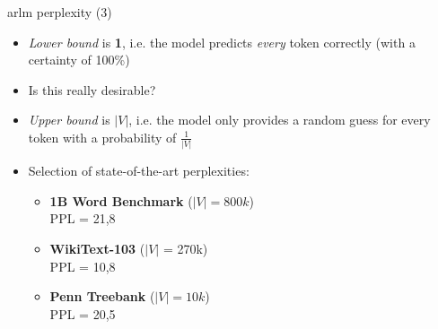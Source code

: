 \documentclass[11pt,compress,t,notes=noshow, xcolor=table]{beamer}
\begin{document}
\begin{frame}{arlm perplexity (3)}

\vfill

\begin{itemize}
	\item \textit{Lower bound} is \textbf{1}, i.e. the model predicts \textit{every} token correctly (with a certainty of 100\%)
	\item \ques Is this really desirable?
	\item \textit{Upper bound} is $|V|$, i.e. the model only provides a random guess for every token with a probability of $\frac{1}{|V|}$
	\item Selection of state-of-the-art perplexities:
			\begin{itemize}
				\item \textbf{1B Word Benchmark}  ($|V| = 800k$)\\
				PPL = 21,8 
				\item \textbf{WikiText-103}  ($|V|$ = 270k)\\
				PPL = 10,8 
				\item \textbf{Penn Treebank}  ($|V| = 10k$)\\
				PPL = 20,5 
			\end{itemize}
\end{itemize}

\vfill

\end{frame}

\end{document}
